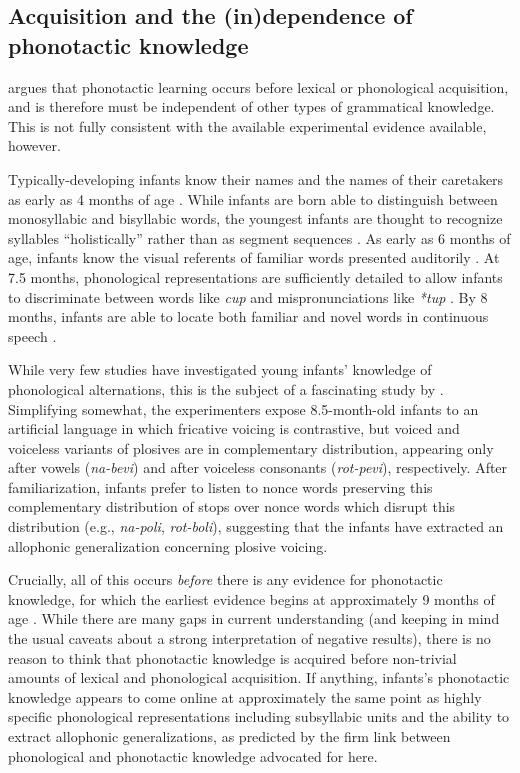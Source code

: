 \subsection{Acquisition and the (in)dependence of phonotactic knowledge}
\label{ss:aerbpp}

\citet{Hayes2004b} argues that phonotactic learning occurs before lexical or phonological acquisition, and is therefore must be independent of other types of grammatical knowledge.
This is not fully consistent with the available experimental evidence available, however.

Typically-developing infants know their names and the names of their caretakers as early as 4 months of age \citep{Bortfeld2005,Mandel1995,Tincoff1999}.
While infants are born able to distinguish between monosyllabic and bisyllabic words, the youngest infants are thought to recognize syllables ``holistically'' rather than as segment sequences \citep{Bertoncini1981,Eimas1999,Jusczyk1987}.
As early as 6 months of age, infants know the visual referents of familiar words presented auditorily \citep{Bergelson2012}.
At 7.5 months, phonological representations are sufficiently detailed to allow infants to discriminate between words like \emph{cup} and mispronunciations like \emph{*tup} \citep{Jusczyk1995}.
By 8 months, infants are able to locate both familiar and novel words in continuous speech \citep{Jusczyk1997,Seidl2006}.

While very few studies have investigated young infants' knowledge of phonological alternations, this is the subject of a fascinating study by \citet{White2008}.
Simplifying somewhat, the experimenters expose 8.5-month-old infants to an artificial language in which fricative voicing is contrastive, but voiced and voiceless variants of plosives are in complementary distribution, appearing only after vowels (\emph{na-bevi}) and after voiceless consonants (\emph{rot-pevi}), respectively.
After familiarization, infants prefer to listen to nonce words preserving this complementary distribution of stops over nonce words which disrupt this distribution (e.g., \emph{na-poli}, \emph{rot-boli}), suggesting that the infants have extracted an allophonic generalization concerning plosive voicing.

Crucially, all of this occurs \emph{before} there is any evidence for phonotactic knowledge, for which the earliest evidence begins at approximately 9 months of age \citep{Friederici1993,Jusczyk1993b,Jusczyk1994}.
While there are many gaps in current understanding (and keeping in mind the usual caveats about a strong interpretation of negative results), there is no reason to think that phonotactic knowledge is acquired before non-trivial amounts of lexical and phonological acquisition.
If anything, infants's phonotactic knowledge appears to come online at approximately the same point as highly specific phonological representations including subsyllabic units and the ability to extract allophonic generalizations, as predicted by the firm link between phonological and phonotactic knowledge advocated for here.

